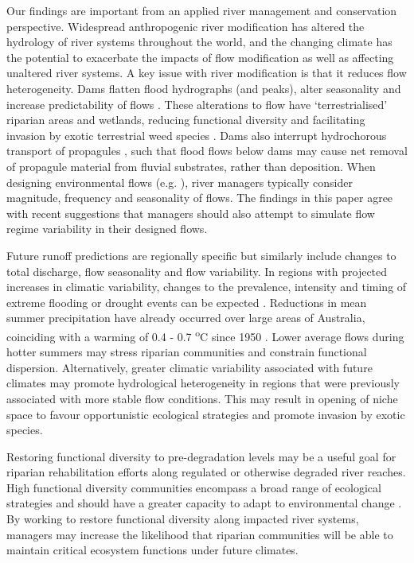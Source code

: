 \documentclass[openright,12pt,a4paper]{memoir}
\begin{document}
Our findings are important from an applied river management and conservation perspective. Widespread anthropogenic river modification has altered the hydrology of river systems throughout the world, and the changing climate has the potential to exacerbate the impacts of flow modification as well as affecting unaltered river systems. A key issue with river modification is that it reduces flow heterogeneity. Dams flatten flood hydrographs (and peaks), alter seasonality and increase predictability of flows \citep{Graf2006, Singer2007}. These alterations to flow have ‘terrestrialised’ riparian areas and wetlands, reducing functional diversity and facilitating invasion by exotic terrestrial weed species \citep{Catford2011}.  Dams also interrupt hydrochorous transport of propagules \citep{Merritt2010a}, such that flood flows below dams may cause net removal of propagule material from fluvial substrates, rather than deposition. When designing environmental flows (e.g. \citet{Howell2000}), river managers typically consider magnitude, frequency and seasonality of flows. The findings in this paper agree with recent suggestions \citep{Naiman2008} that managers should also attempt to simulate flow regime variability in their designed flows.
 
Future runoff predictions are regionally specific but similarly include changes to total discharge, flow seasonality and flow variability. In regions with projected increases in climatic variability, changes to the prevalence, intensity and timing of extreme flooding or drought events can be expected \citep{Hennessy2008}. Reductions in mean summer precipitation have already occurred over large areas of Australia, coinciding with a warming of 0.4 - 0.7 \textsuperscript{o}C since 1950 \citep{Hennessy2007}. Lower average flows during hotter summers may stress riparian communities and constrain functional dispersion. Alternatively, greater climatic variability associated with future climates \citep{Hennessy2008} may promote hydrological heterogeneity in regions that were previously associated with more stable flow conditions. This may result in opening of niche space to favour opportunistic ecological strategies and promote invasion by exotic species.
 
Restoring functional diversity to pre-degradation levels may be a useful goal for riparian rehabilitation efforts along regulated or otherwise degraded river reaches. High functional diversity communities encompass a broad range of ecological strategies and should have a greater capacity to adapt to environmental change \citep{Tilman1997, Standish2014}. By working to restore functional diversity along impacted river systems, managers may increase the likelihood that riparian communities will be able to maintain critical ecosystem functions under future climates.
\end{document}
